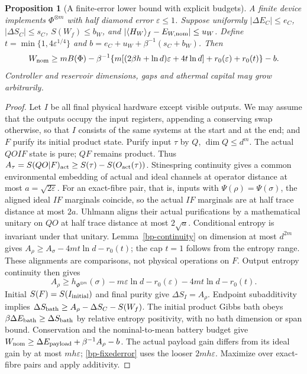\documentclass[11pt]{article}
\newtheorem{proposition}[theorem]{Proposition}
\theoremstyle{definition}
\theoremstyle{remark}
\begin{document}
\begin{proposition}[A finite-error lower bound with explicit budgets]\label{bp-lower}
A finite device implements $\Phi^{\otimes m}$ with half diamond error
$\varepsilon\le1$. Suppose uniformly
$|\Delta E_C|\le e_C$, $|\Delta S_C|\le s_C$, $S(W_f)\le b_W$, and
$|\langle H_W\rangle_f-E_{W,\rm nom}|\le u_W$. Define
$t=\min\{1,4\varepsilon^{1/4}\}$ and
$b=e_C+u_W+\beta^{-1}(s_C+b_W)$. Then
\begin{equation}\label{bp-fixederror}
 W_{\rm nom}\ge mB(\Phi)-\beta^{-1}
 \{m[(2\beta h+\ln d)\varepsilon+4t\ln d]+r_0(\varepsilon)+r_0(t)\}-b.
\end{equation}
Controller and reservoir dimensions, gaps and athermal capital may grow
arbitrarily.
\end{proposition}
\begin{proof}
Let $I$ be all final physical hardware except visible outputs. We may assume that the outputs occupy the input registers, appending a conserving swap otherwise, so that $I$ consists of the same systems at the start and at the end; and $F$
purify its initial product state. Purify input $\tau$ by $Q$, $\dim Q\le
d^m$. The actual $QOIF$ state is pure; $QF$ remains product. Thus
$A_\tau=S(QO|F)_{\rm act}\ge S(\tau)-S(O_{\rm act}(\tau))$.
Stinespring continuity \cite[Thm.~1]{KSW08} gives a common environmental
embedding of actual and ideal channels at operator distance at most
$a=\sqrt{2\varepsilon}$. For an exact-fibre pair, that is, inputs with $\Psi(\rho)=\Psi(\sigma)$, the aligned ideal $IF$
marginals coincide, so the actual $IF$ marginals are at half trace
distance at most $2a$. Uhlmann aligns their actual purifications by a
mathematical unitary on $QO$ at half trace distance at most $2\sqrt a$.
Conditional entropy is invariant under that unitary. Lemma~\ref{bp-continuity}
on dimension at most $d^{2m}$ gives
$A_\rho\ge A_\sigma-4mt\ln d-r_0(t)$; the cap $t=1$ follows from
the entropy range. These alignments are comparisons, not physical
operations on $F$. Output entropy continuity then gives
\[
 A_\rho\ge h_{\Phi^{\otimes m}}(\sigma)
       -m\varepsilon\ln d-r_0(\varepsilon)-4mt\ln d-r_0(t).
\]
Initial $S(F)=S(I_{\rm initial})$ and final purity give
$\Delta S_I=A_\rho$. Endpoint subadditivity implies
$\Delta S_{\rm bath}\ge A_\rho-\Delta S_C-S(W_f)$.
The initial product Gibbs bath obeys
$\beta\Delta E_{\rm bath}\ge\Delta S_{\rm bath}$ by relative entropy
positivity, with no bath dimension or span bound. Conservation and
the nominal-to-mean battery budget give
$W_{\rm nom}\ge\Delta E_{\rm payload}+\beta^{-1}A_\rho-b$.
The actual payload gain differs from its ideal gain by at most
$mh\varepsilon$; \eqref{bp-fixederror} uses the looser $2mh\varepsilon$.
Maximize over exact-fibre pairs and apply additivity.
\end{proof}
\end{document}
